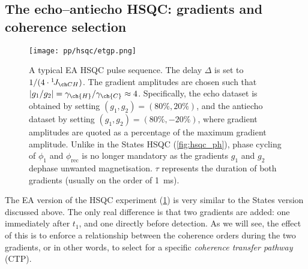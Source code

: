 \subsection{The echo--antiecho HSQC: gradients and coherence selection}
\label{subsec:theory__hsqc_ea}

\begin{figure}[htbp]
    \centering
    \texttt{[image: pp/hsqc/etgp.png]}%
    \caption[Echo--antiecho HSQC pulse sequence]{
        A typical EA HSQC pulse sequence.
        The delay $\Delta$ is set to $1/(4 \cdot \oneJ{CH})$.
        The gradient amplitudes are chosen such that $|g_1/g_2| = \gamma_{\ch{H}}/\gamma_{\ch{C}} \approx 4$.
        Specifically, the echo dataset is obtained by setting $(g_1, g_2) = (80\%, 20\%)$, and the antiecho dataset by setting $(g_1, g_2) = (80\%, -20\%)$, where gradient amplitudes are quoted as a percentage of the maximum gradient amplitude.
        Unlike in the States HSQC (\cref{fig:hsqc_ph}), phase cycling of $\phi_1$ and $\phi_\text{rec}$ is no longer mandatory as the gradients $g_1$ and $g_2$ dephase unwanted magnetisation.
        $\tau$ represents the duration of both gradients (usually on the order of \SI{1}{ms}).
    }
    \label{fig:hsqc_etgp}
\end{figure}

The EA version of the HSQC experiment (\cref{fig:hsqc_etgp}) is very similar to the States version discussed above.
The only real difference is that two gradients are added: one immediately after $t_1$, and one directly before detection.
As we will see, the effect of this is to enforce a relationship between the coherence orders during the two gradients, or in other words, to select for a specific \textit{coherence transfer pathway} (CTP).

